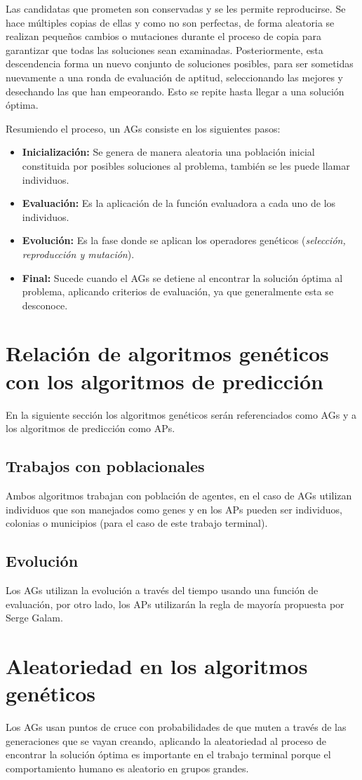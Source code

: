 Las candidatas que prometen son conservadas y se les permite reproducirse. Se hace múltiples copias de ellas y como no son perfectas, de forma aleatoria se realizan pequeños cambios o mutaciones durante el proceso de copia para garantizar que todas las soluciones sean examinadas. Posteriormente, esta descendencia forma un nuevo conjunto de soluciones posibles, para ser sometidas nuevamente a una ronda de evaluación de aptitud, seleccionando las mejores y desechando las que han empeorando. Esto se repite hasta llegar a una solución óptima. 

Resumiendo el proceso, un \acrshort{AGs} consiste en los siguientes pasos: 

\begin{itemize}
    \item \textbf{Inicialización: }Se genera de manera aleatoria una población inicial constituida por posibles soluciones al problema, también se les puede llamar individuos.
    \item \textbf{Evaluación: } Es la aplicación de la función evaluadora a cada uno de los individuos.
    \item \textbf{Evolución: } Es la fase donde se aplican los operadores genéticos (\textit{selección, reproducción y mutación}).
    \item \textbf{Final: }Sucede cuando el \acrshort{AGs} se detiene al encontrar la solución óptima al problema, aplicando criterios de evaluación, ya que generalmente esta se desconoce.
\end{itemize}
\section{Relación de algoritmos genéticos con los algoritmos de predicción}
En la siguiente sección los algoritmos genéticos serán referenciados como \acrshort{AGs} y a los algoritmos de predicción como \acrshort{APs}.

\subsection{Trabajos con poblacionales}
Ambos algoritmos trabajan con población de agentes, en el caso de \acrshort{AGs} utilizan individuos que son manejados como genes y en los \acrshort{APs} pueden ser individuos, colonias o municipios (para el caso de este trabajo terminal).

\subsection{Evolución}
Los \acrshort{AGs} utilizan la evolución a través del tiempo usando una función de evaluación, por otro lado, los \acrshort{APs} utilizarán la regla de mayoría propuesta por Serge Galam.

\section{Aleatoriedad en los algoritmos genéticos}
Los \acrshort{AGs} usan puntos de cruce con probabilidades de que muten a través de las generaciones que se vayan creando, aplicando la aleatoriedad al proceso de encontrar la solución óptima es importante en el trabajo terminal porque el comportamiento humano es aleatorio en grupos grandes.
